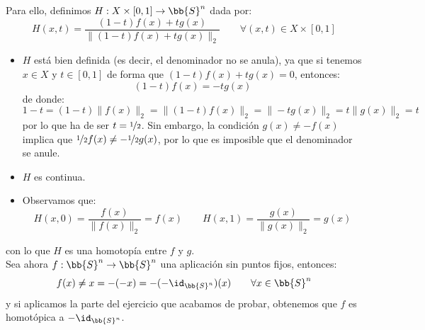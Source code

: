 \begin{ejercicio}
    \noindent
    Para ello, definimos $H:X\times [0,1]\to \bb{S}^n$ dada por:
    \begin{equation*}
        H(x,t) = \dfrac{(1-t)f(x) + tg(x)}{\|(1-t)f(x) + tg(x)\|_2} \qquad \forall (x,t)\in X\times [0,1]
    \end{equation*}
    \begin{itemize}
        \item $H$ está bien definida (es decir, el denominador no se anula), ya que si tenemos $x\in X$ y $t\in [0,1]$ de forma que $(1-t)f(x)+tg(x) = 0 $, entonces:
            \begin{equation*}
                (1-t)f(x) = -tg(x)
            \end{equation*}
            de donde:
            \begin{equation*}
                1-t = (1-t)\|f(x)\|_2 = \|(1-t)f(x)\|_2 = \|-tg(x)\|_2 = t\|g(x)\|_2 = t
            \end{equation*}
            por lo que ha de ser $t = \nicefrac{1}{2}$. Sin embargo, la condición $g(x)\neq -f(x)$ implica que $\nicefrac{1}{2}f(x) \neq -\nicefrac{1}{2}g(x)$, por lo que es imposible que el denominador se anule.
        \item $H$ es continua.
        \item Observamos que:
            \begin{equation*}
                H(x,0) = \dfrac{f(x)}{\|f(x)\|_2} = f(x) \qquad 
                H(x,1) = \dfrac{g(x)}{\|g(x)\|_2} = g(x) 
            \end{equation*}
    \end{itemize}
    con lo que $H$ es una homotopía entre $f$ y $g$.\\

    \noindent
    Sea ahora $f:\bb{S}^n\to \bb{S}^n$ una aplicación sin puntos fijos, entonces:
    \begin{equation*}
        f(x) \neq x = -(-x) = -(-\id_{\bb{S}^n})(x) \qquad \forall x\in \bb{S}^n
    \end{equation*}
    y si aplicamos la parte del ejercicio que acabamos de probar, obtenemos que $f$ es homotópica a $-\id_{\bb{S}^n}$.
\end{ejercicio}

